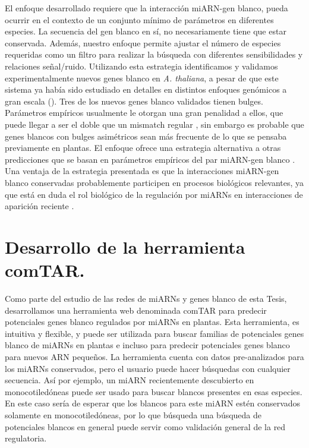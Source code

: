 El enfoque desarrollado requiere que la interacción miARN-gen blanco, pueda ocurrir en el contexto de un conjunto mínimo de parámetros en diferentes especies.
La secuencia del gen blanco en sí, no necesariamente tiene que estar conservada.
Además, nuestro enfoque permite ajustar el número de especies requeridas como un filtro para realizar la búsqueda con diferentes sensibilidades y relaciones señal/ruido.
Utilizando esta estrategia identificamos y validamos experimentalmente nuevos genes blanco en \textit{A. thaliana}, a pesar de que este sistema ya había sido estudiado en detalles en distintos enfoques genómicos a gran escala (\citep{Allen2005207,JonesRhoades2004787,Addo-quaye2009a,German2008,Rajagopalan2006,Schwab2005517}).
Tres de los nuevos genes blanco validados tienen bulges. Parámetros empíricos usualmente le otorgan una gran penalidad a ellos, que puede llegar a ser el doble que un mismatch regular \citep{JonesRhoades2004787},  sin embargo es probable que genes blancos con bulges asimétricos sean más frecuente de lo que se pensaba previamente en plantas.
El enfoque ofrece una estrategia alternativa a otras predicciones que se basan en parámetros empíricos del par miARN-gen blanco \citep{Allen2005207,JonesRhoades2004787,citeulike:8816489,Fahlgren_chapter}.
Una ventaja de la estrategia presentada es que la interacciones miARN-gen blanco conservadas probablemente participen en procesos biológicos relevantes, ya que está en duda el rol biológico de la regulación por miARNs en interacciones de aparición reciente \citep{Axtell2008343,citeulike:8816489}.

\section{Desarrollo de la herramienta comTAR.}

Como parte del estudio de las redes de miARNs y genes blanco de esta Tesis, desarrollamos una herramienta web denominada comTAR para predecir potenciales genes blanco regulados por miARNs en plantas. 
Esta herramienta, es intuitiva y flexible, y puede ser utilizada para buscar familias de potenciales genes blanco de miARNs en plantas e incluso para predecir potenciales genes blanco para nuevos ARN pequeños.
La herramienta cuenta con datos pre-analizados para los miARNs conservados, pero el usuario puede hacer búsquedas con cualquier secuencia.
Así por ejemplo, un miARN recientemente descubierto en monocotiledóneas puede ser usado para buscar blancos presentes en esas especies.
En este caso sería de esperar que los blancos para este miARN estén conservados solamente en monocotiledóneas, por lo que búsqueda una búsqueda de potenciales blancos en general puede servir como validación general de la red regulatoria.

